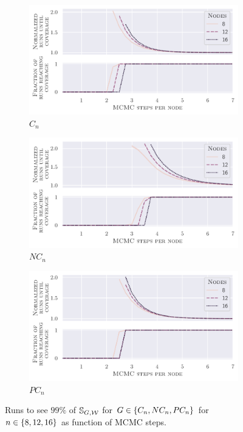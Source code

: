 \begin{figure}[!tb]
  \begin{subfigure}{0.325\textwidth}
    \centering
    \includegraphics[width=\textwidth]{Figures/experiments/Cov_Cycle.pdf}
    \caption{$C_n$}  
  \end{subfigure}
  \hfill
  \begin{subfigure}{0.325\textwidth}
    \centering
    \includegraphics[width=\textwidth]{Figures/experiments/Cov_Nested.pdf}
    \caption{$NC_n$}
  \end{subfigure}
  \hfill
  \begin{subfigure}{0.325\textwidth}
    \centering
    \includegraphics[width=\textwidth]{Figures/experiments/Cov_Paired.pdf}
    \caption{$PC_n$}
  \end{subfigure}
  \caption{
    Runs to see $99\%$ of $\mathbb{S}_{G, \mathcal W}$ for $G \in \left\{C_n,NC_n,PC_n\right\}$ for $n \in \left\{8, 12, 16\right\}$ as function of MCMC steps.
  }
  \label{fig:coverage}
\end{figure}


